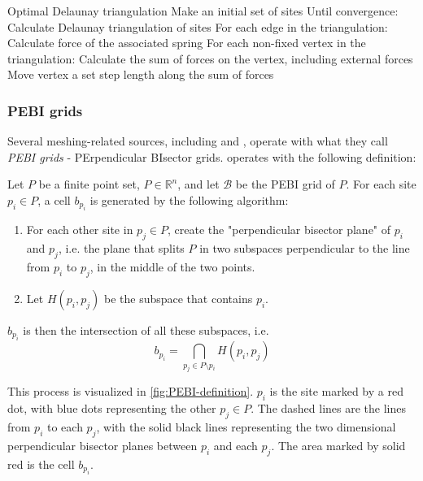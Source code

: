 \begin{pseudocode}[label=alg:delaunay_force]{Optimal Delaunay triangulation}
    Make an initial set of sites
    Until convergence:
        Calculate Delaunay triangulation of sites
        For each edge in the triangulation:
            Calculate force of the associated spring
        For each non-fixed vertex in the triangulation:
            Calculate the sum of forces on the vertex, including external forces
            Move vertex a set step length along the sum of forces
\end{pseudocode}

\subsubsection{PEBI grids}
Several meshing-related sources, including \cite{UPR_chapter} and \cite{UPR_thesis}, operate with what they call \emph{PEBI grids} - PErpendicular BIsector grids. \textcite{UPR_thesis} operates with the following definition:

\begin{definition}
\label{def:PEBI-grid}
Let $P$ be a finite point set, $P \in \mathbb{R}^n$, and let $\mathcal{B}$ be the PEBI grid of $P$. For each site $p_i \in P$, a cell $b_{p_i}$ is generated by the following algorithm:
\begin{enumerate}
    \item For each other site in $p_j \in P$, create the "perpendicular bisector plane" of $p_i$ and $p_j$, i.e. the plane that splits $P$ in two subspaces perpendicular to the line from $p_i$ to $p_j$, in the middle of the two points.
    \item Let $H(p_i, p_j)$ be the subspace that contains $p_i$.
\end{enumerate}
$b_{p_i}$ is then the intersection of all these subspaces, i.e.
\begin{equation}
    b_{p_i} = \bigcap_{p_j \in P \setminus p_i} H(p_i, p_j)
\end{equation}
\end{definition}

This process is visualized in \autoref{fig:PEBI-definition}. $p_i$ is the site marked by a red dot, with blue dots representing the other $p_j \in P$. The dashed lines are the lines from $p_i$ to each $p_j$, with the solid black lines representing the two dimensional perpendicular bisector planes between $p_i$ and each $p_j$. The area marked by solid red is the cell $b_{p_i}$.

